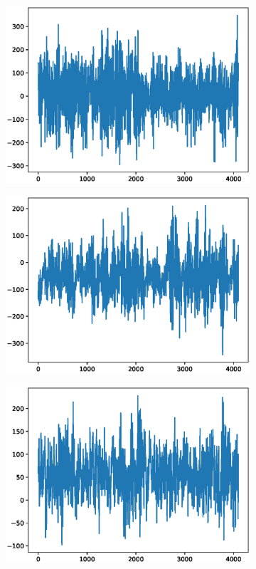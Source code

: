 \documentclass[12pt]{article}
\begin{document}
\begin{figure}
\begin{subfigure}{.25\textwidth}
  \centering
  \includegraphics[width=.8\linewidth]{figures/signals/B/O015.eps}
\end{subfigure}%
\begin{subfigure}{.25\textwidth}
  \centering
  \includegraphics[width=.8\linewidth]{figures/signals/B/O024.eps}
\end{subfigure}
\begin{subfigure}{.25\textwidth}
  \centering
  \includegraphics[width=.8\linewidth]{figures/signals/B/O028.eps}

\end{subfigure}
\end{figure}
\end{document}
